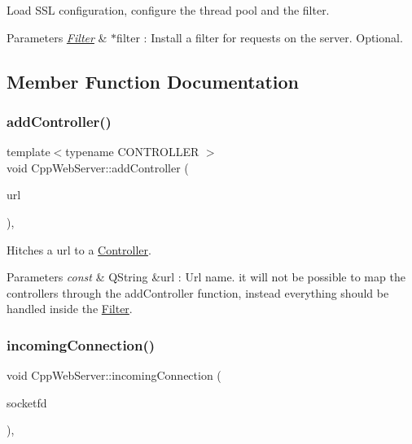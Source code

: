 Load S\+SL configuration, configure the thread pool and the filter. 


\begin{DoxyParams}{Parameters}
{\em \hyperlink{class_filter}{Filter}} & $\ast$filter \+: Install a filter for requests on the server. Optional. \\
\hline
\end{DoxyParams}


\subsection{Member Function Documentation}
\mbox{\label{class_cpp_web_server_a3982d41728fd3237c42dd6dabbf1efb6}} 
\subsubsection{\texorpdfstring{add\+Controller()}{addController()}}
{\footnotesize\ttfamily template$<$typename C\+O\+N\+T\+R\+O\+L\+L\+ER $>$ \\
void Cpp\+Web\+Server\+::add\+Controller (\begin{DoxyParamCaption}\item[{const Q\+String \&}]{url }\end{DoxyParamCaption})\hspace{0.3cm}{\ttfamily [inline]}, {\ttfamily [noexcept]}}



Hitches a url to a \hyperlink{class_controller}{Controller}. 


\begin{DoxyParams}{Parameters}
{\em const} & Q\+String \&url \+: Url name. it will not be possible to map the controllers through the add\+Controller function, instead everything should be handled inside the \hyperlink{class_filter}{Filter}. \\
\hline
\end{DoxyParams}
\mbox{\label{class_cpp_web_server_a49addc6ee3148d11134062e6b7a56791}} 
\subsubsection{\texorpdfstring{incoming\+Connection()}{incomingConnection()}}
{\footnotesize\ttfamily void Cpp\+Web\+Server\+::incoming\+Connection (\begin{DoxyParamCaption}\item[{qintptr}]{socketfd }\end{DoxyParamCaption})\hspace{0.3cm}{\ttfamily [override]}, {\ttfamily [protected]}}



